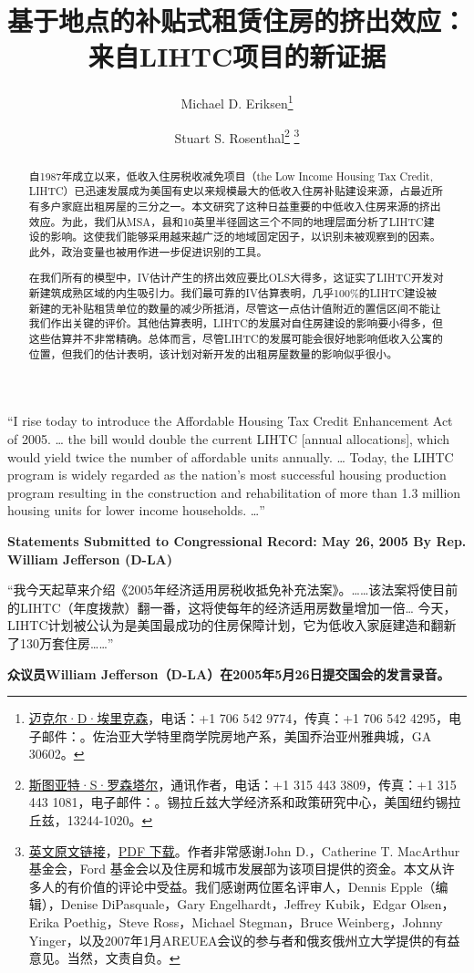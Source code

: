 \documentclass[lang=cn,11pt,a4paper]{paper}
\title{基于地点的补贴式租赁住房的挤出效应：来自LIHTC项目的新证据}
\author{Michael D. Eriksen\thanks{\href{http://www.eriksen.myweb.uga.edu}{迈克尔·D·埃里克森}，电话：+1 706 542 9774，传真：+1 706 542 4295，电子邮件：\email{eriksen@terry.uga.edu}。佐治亚大学特里商学院房地产系，美国乔治亚州雅典城，GA 30602。} \and Stuart S. Rosenthal\thanks{\href{http://www.faculty.maxwell.syr.edu/rosenthal}{斯图亚特·S·罗森塔尔}，通讯作者，电话：+1 315 443 3809，传真：+1 315 443 1081，电子邮件：\email{ssrosent@maxwell.syr.edu}。锡拉丘兹大学经济系和政策研究中心，美国纽约锡拉丘兹，13244-1020。}\; \thanks{\href{https://www.sciencedirect.com/science/article/pii/S0047272710000885}{\faLink\;英文原文链接}，\href{https://sci-hub.tw/10.1016/j.jpubeco.2010.07.002}{\faFilePdf[regular]\;PDF 下载}。作者非常感谢John D.，Catherine T. MacArthur 基金会，Ford 基金会以及住房和城市发展部为该项目提供的资金。本文从许多人的有价值的评论中受益。我们感谢两位匿名评审人，Dennis Epple（编辑），Denise DiPasquale，Gary Engelhardt，Jeffrey Kubik，Edgar Olsen，Erika Poethig，Steve Ross，Michael Stegman，Bruce Weinberg，Johnny Yinger，以及2007年1月AREUEA会议的参与者和俄亥俄州立大学提供的有益意见。当然，文责自负。}}
\date{\zhtoday}
\begin{document}
\maketitle

\begin{abstract}
  \hspace{2\ccwd}自1987年成立以来，低收入住房税收减免项目（the Low Income Housing Tax Credit, LIHTC）已迅速发展成为美国有史以来规模最大的低收入住房补贴建设来源，占最近所有多户家庭出租房屋的三分之一。本文研究了这种日益重要的中低收入住房来源的挤出效应。为此，我们从MSA，县和10英里半径圆这三个不同的地理层面分析了LIHTC建设的影响。这使我们能够采用越来越广泛的地域固定因子，以识别未被观察到的因素。此外，政治变量也被用作进一步促进识别的工具。
  
  \!在我们所有的模型中，IV估计产生的挤出效应要比OLS大得多，这证实了LIHTC开发对新建筑成熟区域的内生吸引力。我们最可靠的IV估算表明，几乎100\%的LIHTC建设被新建的无补贴租赁单位的数量的减少所抵消，尽管这一点估计值附近的置信区间不能让我们作出关键的评价。其他估算表明，LIHTC的发展对自住房建设的影响要小得多，但这些估算并不非常精确。总体而言，尽管LIHTC的发展可能会很好地影响低收入公寓的位置，但我们的估计表明，该计划对新开发的出租房屋数量的影响似乎很小。

\end{abstract}
\vspace{10pt}

\begin{tcolorbox}[
	colback=yellow!10!white,
  colframe=red!30!black,
  fontupper = \itshape,
]
“I rise today to introduce the Affordable Housing Tax Credit Enhancement Act of 2005. … the bill would double the current LIHTC [annual allocations], which would yield twice the number of affordable units annually. … Today, the LIHTC program is widely regarded as the nation's most successful housing production program resulting in the construction and rehabilitation of more than 1.3 million housing units for lower income households. …”
\vspace{5pt}

\textbf{Statements Submitted to Congressional Record: May 26, 2005 By Rep. William Jefferson (D-LA)}

\tcblower

“我今天起草来介绍《2005年经济适用房税收抵免补充法案》。……该法案将使目前的LIHTC（年度拨款）翻一番，这将使每年的经济适用房数量增加一倍… 今天，LIHTC计划被公认为是美国最成功的住房保障计划，它为低收入家庭建造和翻新了130万套住房……”
\vspace{5pt}

\textbf{众议员William Jefferson（D-LA）在2005年5月26日提交国会的发言录音。}

\end{tcolorbox}
\vspace{10pt}
\end{document}
